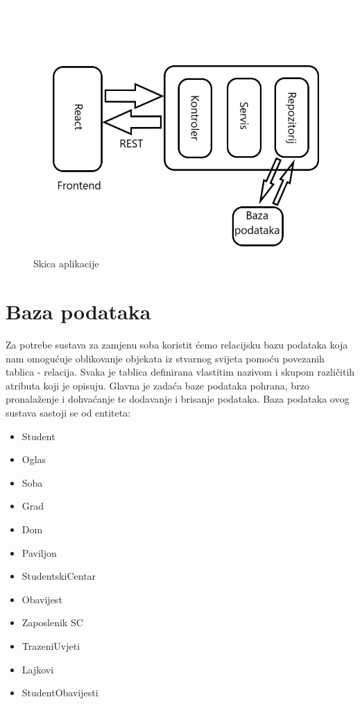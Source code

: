 \begin{figure}[H]
\includegraphics[scale=0.4]{slike/Skica_aplikacije.png} %
\centering
\caption{Skica aplikacije}
\label{fig:aplikacija}
\end{figure}


	
		

		

				
		\section{Baza podataka}
			
		Za potrebe sustava za zamjenu soba koristit ćemo relacijsku bazu podataka koja nam omogućuje oblikovanje objekata iz stvarnog svijeta pomoću povezanih tablica - relacija. Svaka je tablica definirana vlastitim nazivom i skupom različitih atributa koji je opisuju. Glavna je zadaća baze podataka pohrana, brzo pronalaženje i dohvaćanje te dodavanje i brisanje podataka. Baza podataka ovog sustava sastoji se od entiteta:
		\begin{itemize}
			\item Student
			\item Oglas
			\item Soba
			\item Grad
			\item Dom
			\item Paviljon
			\item StudentskiCentar
			\item Obavijest
			\item Zaposlenik SC
			\item TrazeniUvjeti
			\item Lajkovi
			\item StudentObavijesti
			
		\end{itemize}
		
